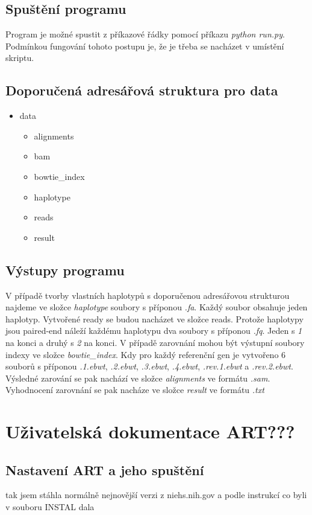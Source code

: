 \documentclass[czech,DP]{thesiskiv}
\numberwithin{equation}{section}
\begin{document}
\section{Spuštění programu}
Program je možné spustit z příkazové řádky pomocí příkazu \textit {python run.py}. Podmínkou fungování tohoto postupu je, že je třeba se nacházet v umístění skriptu. 

\section{Doporučená adresářová struktura pro data}
\begin{itemize}
	\item data
		\begin{itemize}
			\item alignments
			\item bam
			\item bowtie\_index
			\item haplotype
			\item reads
			\item result
		\end{itemize}
\end{itemize}

\section{Výstupy programu}
V případě tvorby vlastních haplotypů s doporučenou adresářovou strukturou najdeme ve složce \textit{haplotype} soubory s příponou \textit{.fa}. Každý soubor obsahuje jeden haplotyp.
Vytvořené ready se budou nacházet ve složce reads. Protože haplotypy jsou paired-end náleží každému haplotypu dva soubory s příponou \textit{.fq}. Jeden s \textit{1} na konci a druhý s \textit{2} na konci. 
V případě zarovnání mohou být výstupní soubory indexy ve složce \textit{bowtie\_index}. Kdy pro každý referenční gen je vytvořeno 6 souborů s příponou \textit{.1.ebwt}, \textit{.2.ebwt}, \textit{.3.ebwt}, \textit{.4.ebwt}, \textit{.rev.1.ebwt} a \textit{.rev.2.ebwt}. Výsledné zarování se pak nachází ve složce \textit{alignments} ve formátu \textit{.sam}. Vyhodnocení zarovnání se pak nacháze ve složce \textit{result} ve formátu \textit{.txt}

\chapter{Uživatelská dokumentace ART???}
\section{Nastavení ART a jeho spuštění}
tak jsem stáhla normálně nejnovější verzi z niehs.nih.gov a podle instrukcí co byli v souboru INSTAL dala %
\end{document}
